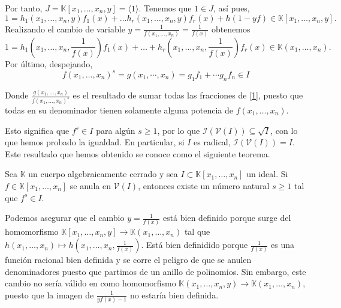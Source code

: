 \documentclass[ACGA.tex]{subfiles}
\begin{document}
Por tanto, $J=\mathbb{K}[x_1,\dotsc,x_n,y]=\langle 1 \rangle$. Tenemos que $1\in J$, así pues, 
$$
1=h_1(x_1,\dotsc,x_n,y)f_1(x)+\dotsc h_r(x_1,\dotsc,x_n,y) f_r(x)+ h(1-yf)\in \mathbb{K}[x_1,\dotsc,x_n,y].$$
Realizando el cambio de variable $y=\frac{1}{f(x_1,\dots,x_n)}=\frac{1}{f(x)}$ obtenemos
\begin{equation}
1 = h_1(x_1,\dotsc,x_n,\frac{1}{f(x)})f_1(x)+\dotsc+h_r(x_1,\dotsc,x_n,\frac{1}{f(x)})f_r(x)\in  \mathbb{K}(x_1,\dotsc,x_n).\label{1}
\end{equation}
Por último, despejando,
$$f(x_1,\dotsc,x_n)^s = g(x_1,\cdots,x_n) = g_1 f_1 + \cdots g_n f_n \in I$$

Donde $\frac{g(x_1,\dotsc,x_n)}{f(x_1,\dotsc,x_n)^s}$ es el resultado de sumar todas las fracciones de \ref{1}, puesto que todas en su denominador tienen solamente alguna potencia de $f(x_1,\dotsc,x_n)$.

Esto significa que $f^s\in I$ para algún $s\geq 1$, por lo que $\mathcal{I}(\mathcal{V}(I))\subseteq\sqrt{I}$, con lo que hemos probado la igualdad. En particular, si $I$ es radical, $\mathcal{I}(\mathcal{V}(I)) = I$. Este resultado que hemos obtenido se conoce como el siguiente teorema.

\begin{teorema}
Sea $\mathbb{K}$ un cuerpo algebraicamente cerrado y sea $I\subset\mathbb{K}[x_1,\dots,x_n]$ un ideal. Si $f\in\mathbb{K}[x_1,\dots,x_n]$ se anula en $\mathcal{V}(I)$, entonces existe un número natural $s\geq 1$ tal que $f^s\in I$. 

\end{teorema}

\begin{nota}
Podemos asegurar que el cambio $y=\frac{1}{f(x)}$ está bien definido porque surge del homomorfismo $\mathbb{K}[x_1,\dots,x_n,y]\rightarrow\mathbb{K}(x_1,\dots,x_n)$ tal que $h(x_1,\dots,x_n)\mapsto h(x_1,\dots,x_n,\frac{1}{f(x)})$. Está bien definidido porque $\frac{1}{f(x)}$ es una función racional bien definida y se corre el peligro de que se anulen denominadores puesto que partimos de un anillo de polinomios. Sin embargo, este cambio no sería válido en como homomorfismo  $\mathbb{K}(x_1,\dots,x_n,y)\rightarrow\mathbb{K}(x_1,\dots,x_n)$, puesto que la imagen de $\frac{1}{yf(x)-1}$ no estaría bien definida.
\end{nota}
\end{document}
